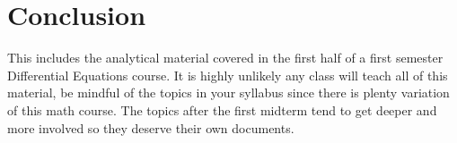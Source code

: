 \documentclass[12pt]{article}
\begin{document}
\section{Conclusion}

This includes the analytical material covered in the first half of a first semester Differential Equations course. It is highly unlikely any class will teach all of this material, be mindful of the topics in your syllabus since there is plenty variation of this math course. The topics after the first midterm tend to get deeper and more involved so they deserve their own documents.
\end{document}
